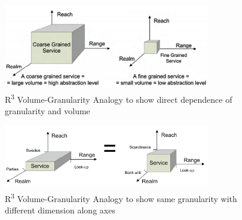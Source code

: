 \begin{figure}[H]
\begin{center}
\includegraphics[width=0.8\textwidth]{figures/Granularity-R3-three}
\caption{R\textsuperscript{3} Volume-Granularity Analogy to show direct dependence of granularity and volume \cite{Pierre-Reldin:2007aa}}
\label{fig:R3 volume-granularity analogy greater}
\end{center}
\end{figure}

\begin{figure}[H]
\begin{center}
\includegraphics[width=0.8\textwidth]{figures/Granularity-R3-four}
\caption{R\textsuperscript{3} Volume-Granularity Analogy to show same granularity with different dimension along axes \cite{Pierre-Reldin:2007aa}}
\label{fig:R3 volume-granularity analogy equal}
\end{center}
\end{figure}


